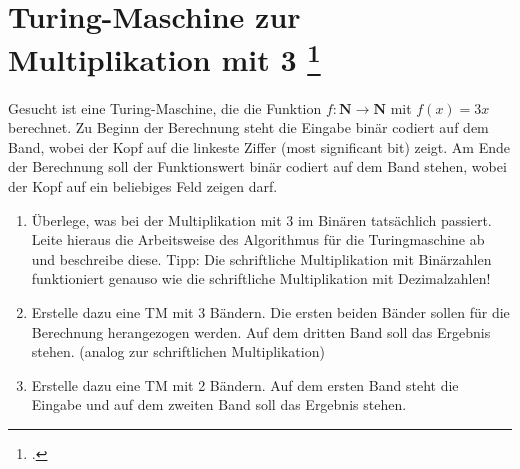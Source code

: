 \documentclass{lehramt-informatik-aufgabe}
\begin{document}
\section{Turing-Maschine zur Multiplikation mit 3
\footcite{theo:ab:3}}

Gesucht ist eine Turing-Maschine, die die Funktion $f : \mathbf{N}
\rightarrow \mathbf{N}$ mit $f(x) = 3x$ berechnet. Zu Beginn der
Berechnung steht die Eingabe binär codiert auf dem Band, wobei der Kopf
auf die linkeste Ziffer (most significant bit) zeigt. Am Ende der
Berechnung soll der Funktionswert binär codiert auf dem Band stehen,
wobei der Kopf auf ein beliebiges Feld zeigen darf.

\begin{enumerate}


\item Überlege, was bei der Multiplikation mit 3 im Binären tatsächlich
passiert. Leite hieraus die Arbeitsweise des Algorithmus für die
Turingmaschine ab und beschreibe diese. Tipp: Die schriftliche
Multiplikation mit Binärzahlen funktioniert genauso wie die schriftliche
Multiplikation mit Dezimalzahlen!


\item Erstelle dazu eine TM mit 3 Bändern. Die ersten beiden Bänder
sollen für die Berechnung herangezogen werden. Auf dem dritten Band soll
das Ergebnis stehen. (analog zur schriftlichen Multiplikation)


\item Erstelle dazu eine TM mit 2 Bändern. Auf dem ersten Band steht die
Eingabe und auf dem zweiten Band soll das Ergebnis stehen.
\end{enumerate}
\end{document}
